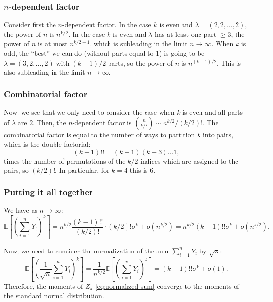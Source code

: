 \documentclass[letterpaper,11pt,oneside,reqno]{article}
\numberwithin{equation}{section}
\theoremstyle{definition}
\begin{document}
\subsubsection{$n$-dependent factor}
\label{subsub:n-dependent-factor}

Consider first the $n$-dependent factor.
In the case $k$ is even and $\lambda=(2,2,\ldots,2 )$, the power
of $n$ is $n^{k/2}$.
In the case $k$ is even and $\lambda$ has at least one
part $\ge 3$, the power of $n$ is at most $n^{k/2-1}$,
which is subleading in the limit $n\to\infty$.
When $k$ is odd, the ``best'' we can do
(without parts equal to $1$)
is going to be
$\lambda=(3,2,\ldots, 2)$ with $(k-1)/2$ parts,
so the power of $n$ is $n^{(k-1)/2}$. This is also subleading
in the limit $n\to\infty$.


\subsubsection{Combinatorial factor}

Now, we see that we only need to consider the
case when $k$ is even and all parts of $\lambda$ are $2$.
Then, the $n$-dependent factor is $\binom{n}{k/2}\sim
n^{k/2}/(k/2)!$.
The combinatorial factor is
equal to the number of ways to partition $k$ into
pairs, which is the double factorial:
\begin{equation*}
	(k-1)!!=(k-1)(k-3)\ldots 1,
\end{equation*}
times the number of permutations
of the $k/2$ indices which are assigned to the pairs,
so $(k/2)!$.
In particular, for $k=4$ this is $6$.

\subsubsection{Putting it all together}

We have as $n\to\infty$:
\begin{equation*}
	\mathbb{E}\left[ \left( \sum_{i=1}^n Y_i \right)^k \right]
	=
	n^{k/2}
	\frac{(k-1)!!}{(k/2)!}\cdot (k/2)!
	\sigma^k
	+o(n^{k/2})=
	n^{k/2}
	(k-1)!!
	\sigma^k
	+o(n^{k/2}).
\end{equation*}

Now, we need to consider the normalization of the sum
$\sum_{i=1}^n Y_i$ by $\sqrt{n}$:
\begin{equation*}
	\mathbb{E}\left[ \left( \frac{1}{\sqrt{n}} \sum_{i=1}^n Y_i \right)^k \right]
	=
	\frac{1}{n^{k/2}}
	\mathbb{E}\left[ \left( \sum_{i=1}^n Y_i \right)^k \right]
	=
	(k-1)!!
	\sigma^k
	+o(1).
\end{equation*}
Therefore, the moments of
$Z_n$ \eqref{eq:normalized-sum}
converge to the moments of the standard normal distribution.
\end{document}

